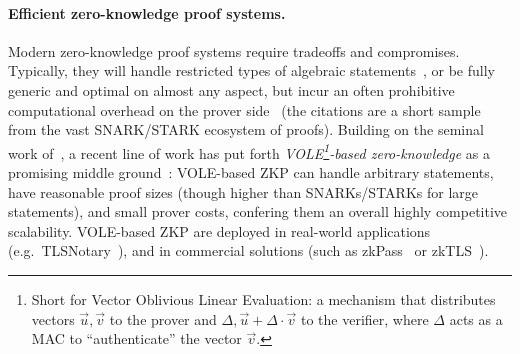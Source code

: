 \documentclass[journal=tosc,submission]{iacrtrans}
\theoremstyle{theorem}
\begin{document}
\paragraph{Efficient zero-knowledge proof systems.} Modern zero-knowledge proof systems require tradeoffs and compromises. Typically, they will handle restricted types of algebraic statements~\cite{C:Schnorr89,EC:GroSah08}, or be fully generic and optimal on almost any aspect, but incur an often prohibitive computational overhead on the prover side~\cite{EC:BCCGP16,EC:Groth16,CCS:AHIV17,SP:BBBPWM18,ICALP:BBHR18,EC:BCRSVW19,CCS:MBKM19,C:Setty20,EC:CBBZ23} (the citations are a short sample from the vast SNARK/STARK ecosystem of proofs). Building on the seminal work of~\cite{STOC:IKOS07}, a recent line of work has put forth \emph{VOLE\footnote{Short for Vector Oblivious Linear Evaluation: a mechanism that distributes vectors $\vec u, \vec v$ to the prover and $\Delta, \vec u+\Delta\cdot \vec v$ to the verifier, where $\Delta$ acts as a MAC to ``authenticate'' the vector $\vec v$.}-based zero-knowledge} as a promising middle ground~\cite{CCS:BCGI18,SP:WYKW21,ITC:DitIshOst21,CCS:YSWW21,C:BMRS21}: VOLE-based ZKP can handle arbitrary statements, have reasonable proof sizes (though higher than SNARKs/STARKs for large statements), and small prover costs, confering them an overall highly competitive scalability. VOLE-based ZKP are deployed in real-world applications (e.g.\ TLSNotary~\cite{tlsnotary}), and in commercial solutions (such as {\sf zkPass}~\cite{zkpass} or {\sf zkTLS}~\cite{primus}).
\end{document}
